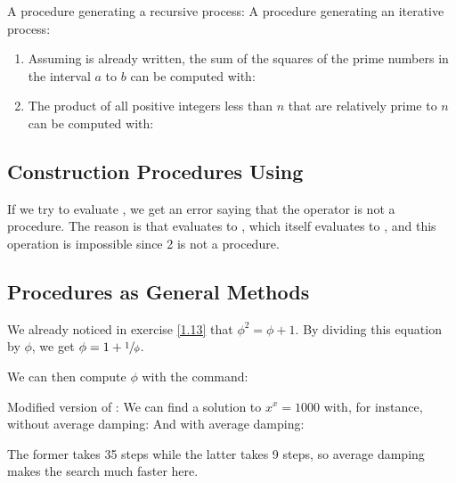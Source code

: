 \begin{exe}[1.33]
    A  procedure generating a recursive process:
    A  procedure generating an iterative process:
    \begin{enumerate}
        \item Assuming  is already written, the sum of the squares 
            of the prime numbers in the interval $a$ to $b$ can be computed 
            with:
        \item The product of all positive integers less than $n$ that are 
            relatively prime to $n$ can be computed with:
    \end{enumerate}
\end{exe}

\subsection{Construction Procedures Using }

\begin{exe}[1.34]
    If we try to evaluate , we get an error saying that the operator 
    is not a procedure. The reason is that  evaluates to
    , which itself evaluates to , and this operation is 
    impossible since 2 is not a procedure.
\end{exe}

\subsection{Procedures as General Methods}
\label{1.3.3}

\begin{exe}[1.35]
    We already noticed in exercise \ref{1.13} that $\phi^2 = \phi + 1$. By 
    dividing this equation by $\phi$, we get $\phi = 1 + \sfrac{1}{\phi}$.

    We can then compute $\phi$ with the command:
\end{exe}

\begin{exe}[1.36]
    Modified version of :
    We can find a solution to $x^x = 1000$ with, for instance, without average 
    damping:
    And with average damping:

    The former takes 35 steps while the latter takes 9 steps, so average damping 
    makes the search much faster here.
\end{exe}

